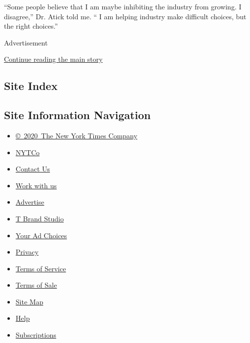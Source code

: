 ``Some people believe that I am maybe inhibiting the industry from
growing. I disagree,'' Dr. Atick told me. `` I am helping industry make
difficult choices, but the right choices.''

Advertisement

\protect\hyperlink{after-bottom}{Continue reading the main story}

\hypertarget{site-index}{%
\subsection{Site Index}\label{site-index}}

\hypertarget{site-information-navigation}{%
\subsection{Site Information
Navigation}\label{site-information-navigation}}

\begin{itemize}
\tightlist
\item
  \href{https://help.nytimes3xbfgragh.onion/hc/en-us/articles/115014792127-Copyright-notice}{©~2020~The
  New York Times Company}
\end{itemize}

\begin{itemize}
\tightlist
\item
  \href{https://www.nytco.com/}{NYTCo}
\item
  \href{https://help.nytimes3xbfgragh.onion/hc/en-us/articles/115015385887-Contact-Us}{Contact
  Us}
\item
  \href{https://www.nytco.com/careers/}{Work with us}
\item
  \href{https://nytmediakit.com/}{Advertise}
\item
  \href{http://www.tbrandstudio.com/}{T Brand Studio}
\item
  \href{https://www.nytimes3xbfgragh.onion/privacy/cookie-policy\#how-do-i-manage-trackers}{Your
  Ad Choices}
\item
  \href{https://www.nytimes3xbfgragh.onion/privacy}{Privacy}
\item
  \href{https://help.nytimes3xbfgragh.onion/hc/en-us/articles/115014893428-Terms-of-service}{Terms
  of Service}
\item
  \href{https://help.nytimes3xbfgragh.onion/hc/en-us/articles/115014893968-Terms-of-sale}{Terms
  of Sale}
\item
  \href{https://spiderbites.nytimes3xbfgragh.onion}{Site Map}
\item
  \href{https://help.nytimes3xbfgragh.onion/hc/en-us}{Help}
\item
  \href{https://www.nytimes3xbfgragh.onion/subscription?campaignId=37WXW}{Subscriptions}
\end{itemize}
